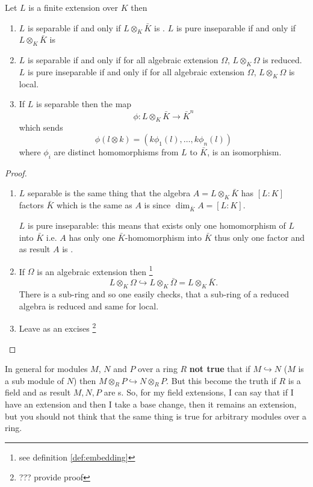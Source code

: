 \begin{theorem}
  Let $L$ is a finite extension over $K$ then
  \begin{enumerate}
  \item $L$ is separable if and only if $L \otimes_K \bar{K}$
    is .
    $L$ is pure inseparable if and only if $L \otimes_K \bar{K}$
    is 
  \item $L$ is separable if and only if for all algebraic extension
    $\Omega$, $L \otimes_K \Omega$ is reduced.
    $L$ is pure inseparable if and only if for all algebraic extension
    $\Omega$, $L \otimes_K \Omega$ is local.
  \item If $L$ is separable then the map
    \[
    \phi: L \otimes_K \bar{K} \to \bar{K}^n
    \]
    which sends
    \[
    \phi\left(l \otimes k\right) =
    \left(
    k \phi_1\left(l\right),
    \dots,
    k \phi_n\left(l\right)
    \right)
    \]
    where $\phi_i$ are distinct homomorphisms from $L$ to $\bar{K}$, 
    is an isomorphism.
  \end{enumerate}
  \begin{proof}
    \begin{enumerate}
    \item $L$ separable is the same thing that the algebra
      $A = L\otimes_K \bar{K}$ has $\left[L:K\right]$ factors
      $\bar{K}$ which is the same as $A$ is 
      since $\dim_{\bar{K}} A = \left[L:K\right]$.

      $L$ is pure inseparable: this means that exists only one
      homomorphism of $L$ into $\bar{K}$ i.e. $A$ has only one
      $\bar{K}$-homomorphism into $\bar{K}$ thus only one factor and
      as result $A$ is .
    \item If $\Omega$ is an algebraic extension then
      \footnote {
        see definition \ref{def:embedding}
      }
      \[
      L \otimes_K \Omega \hookrightarrow L \otimes_K \bar{\Omega} =
      L \otimes_K \bar{K}.
      \]
      There is a sub-ring and so one easily checks, that a sub-ring of
      a reduced algebra is reduced and same for local.  
    \item Leave as an excises
      \footnote{
        ??? provide proof
      }
    \end{enumerate}
  \end{proof}
  \label{thm:lec5_1}
\end{theorem}
\begin{remark}
In general for modules $M$, $N$ and $P$ over a ring $R$ \textbf{not true} that
if $M \hookrightarrow N$ ($M$ is a sub module of $N$) then
$M \otimes_R P \hookrightarrow N \otimes_R P$. But this become the
truth if $R$ is a field and as result $M,N,P$ are
s. So, for my field extensions, I can say
that if I have an extension and then I take a base change, then it
remains an extension, but  you should not think that the same thing is
true for arbitrary modules over a ring.  
\end{remark}

